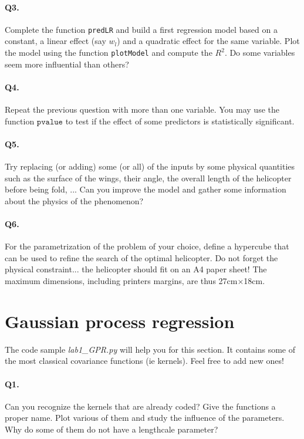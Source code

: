 \documentclass[12pt]{scrartcl}
\begin{document}
\paragraph{Q3.} Complete the function \texttt{predLR} and build a first regression model based on a constant, a linear effect (say $w_l$) and a quadratic effect for the same variable. Plot the model using the function \texttt{plotModel} and compute the $R^2$. Do some variables seem more influential than others?

\paragraph{Q4.} Repeat the previous question with more than one variable. You may use the function $\texttt{pvalue}$ to test if the effect of some predictors is statistically significant.

\paragraph{Q5.} Try replacing (or adding) some (or all) of the inputs by some physical quantities such as the surface of the wings, their angle, the overall length of the helicopter before being fold, ... Can you improve the model and gather some information about the physics of the phenomenon?

\paragraph{Q6.} For the parametrization of the problem of your choice, define a hypercube that can be used to refine the search of the optimal helicopter. Do not forget the physical constraint... the helicopter should fit on an A4 paper sheet! The maximum dimensions, including printers margins, are thus 27cm$\times$18cm.

\section{Gaussian process regression}
The code sample \emph{lab1\_GPR.py} will help you for this section. It contains some of the most classical covariance functions (ie kernels). Feel free to add new ones!

\paragraph{Q1.} Can you recognize the kernels that are already coded? Give the functions a proper name. Plot various of them and study the influence of the parameters. Why do some of them do not have a lengthcale parameter?
\end{document}
